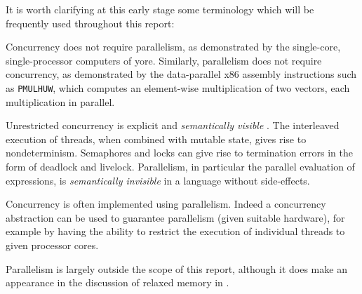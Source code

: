 It is worth clarifying at this early stage some terminology which will
be frequently used throughout this report:



Concurrency does not require parallelism, as demonstrated by the
single-core, single-processor computers of yore. Similarly,
parallelism does not require concurrency, as demonstrated by the
data-parallel x86 assembly instructions such as \verb|PMULHUW|, which
computes an element-wise multiplication of two vectors, each
multiplication in parallel.

Unrestricted concurrency is explicit and \emph{semantically visible}
\citep{concurrent}. The interleaved execution of threads, when
combined with mutable state, gives rise to nondeterminism. Semaphores
and locks can give rise to termination errors in the form of deadlock
and livelock. Parallelism, in particular the parallel evaluation of
expressions, is \emph{semantically invisible} in a language without
side-effects.

Concurrency is often implemented using parallelism. Indeed a
concurrency abstraction can be used to guarantee parallelism (given
suitable hardware), for example by having the ability to restrict the
execution of individual threads to given processor cores.

Parallelism is largely outside the scope of this report, although it
does make an appearance in the discussion of relaxed memory in
.
